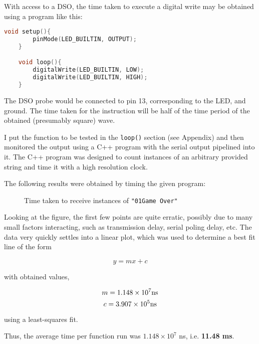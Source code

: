 \newpage


\begin{arabicparts}
    
    \questionpart
    With access to a DSO, the time taken to execute a digital write
    may be obtained using a program like this:
    
    \begin{lstlisting}[language=C++]
    void setup(){
        pinMode(LED_BUILTIN, OUTPUT);
    }

    void loop(){
        digitalWrite(LED_BUILTIN, LOW);
        digitalWrite(LED_BUILTIN, HIGH);
    }
    \end{lstlisting}

    The DSO probe would be connected to pin 13, corresponding to
    the LED, and ground. The time taken for the instruction will
    be half of the time period of the obtained (presumably square) wave.

    \questionpart
    I put the function to be tested in the \texttt{loop()} section (see Appendix)
    and then monitored the output using a C++ program with the serial output 
    pipelined into it. The C++ program was designed to count instances 
    of an arbitrary provided string and time it with a high resolution clock.
    
    The following results were obtained by timing the given program:

    \begin{figure}[ht]
        \centering
        
        \caption{Time taken to receive instances of \texttt{"01Game Over"}}
        \label{fig:timegraph}
    \end{figure}

    Looking at the figure, the first few points are quite erratic, possibly
    due to many small factors interacting, such as transmission delay, serial
    poling delay, etc. The data very quickly settles into a linear plot, which
    was used to determine a best fit line of the form

    $$y = mx + c$$
    
    with obtained values,

    $$m = 1.148 \times 10^{7} \textnormal{ns}$$
    $$c = 3.907 \times 10^{5} \textnormal{ns}$$

    using a least-squares fit.

    Thus, the average time per function run was $1.148 \times 10^{7}$ ns, i.e. \textbf{11.48 ms}.


\end{arabicparts}
